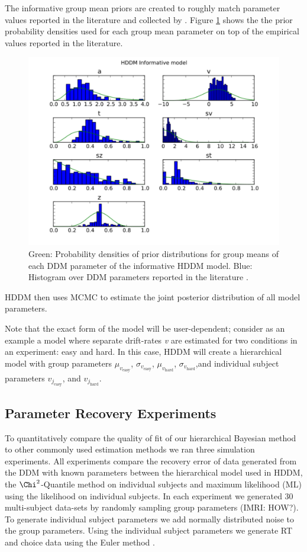 \documentclass[letterpaper,10pt,english]{article}
\begin{document}
The informative group mean priors are created to roughly match parameter values reported in the literature and collected by \citep{MatzkeWagenmakers09}. Figure \ref{fig.priors} shows the the prior probability densities used for each group mean parameter on top of the empirical values reported in the literature.
\begin{figure}[htbp]
\centering
\includegraphics[scale=.5]{hddm_info_priors.pdf}
\caption{Green: Probability densities of prior distributions for group means of each DDM parameter of the informative HDDM model. Blue: Histogram over DDM parameters reported in the literature \citep{MatzkeWagenmakers09}.}
\label{fig.priors}
\end{figure}

HDDM then uses MCMC to estimate the joint posterior distribution of
all model parameters.

Note that the exact form of the model will be user-dependent; consider as an example a model where separate drift-rates \emph{v} are estimated for two conditions in an experiment: easy and hard. In this case, HDDM will create a hierarchical model with group parameters $\mu_{v_{\text{easy}}}$, $\sigma_{v_{\text{easy}}}$, $\mu_{v_{\text{hard}}}$, $\sigma_{v_{\text{hard}}}$,and individual subject parameters $v_{j_{\text{easy}}}$, and $v_{j_{\text{hard}}}$.

\subsection*{Parameter Recovery Experiments}
To quantitatively compare the quality of fit of our hierarchical Bayesian method to other commonly used estimation methods we ran three simulation experiments. All experiments compare the recovery error of data generated from the DDM with known parameters between the hierarchical model used in HDDM, the $\Chi^2$-Quantile method on individual subjects \citep{RatcliffTuerlinckx02} and maximum likelihood (ML) using the \citet{NavarroFuss09} likelihood on individual subjects. In each experiment we generated 30 multi-subject data-sets by randomly sampling group parameters (IMRI: HOW?). To generate individual subject parameters we add normally distributed noise to the group parameters. Using the individual subject parameters we generate RT and choice data using the Euler method \citep{TuerlinckxMarisRatcliffEtAl01}.
\end{document}
